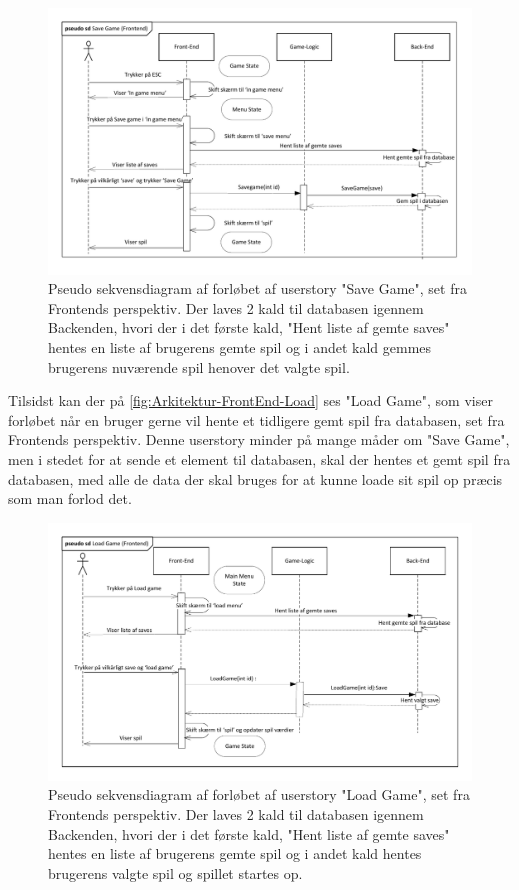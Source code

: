 \begin{figure}[H]
\centering
\includegraphics[width = \textwidth]{02-Body/Images/Front-End_-_Arkitektur-savegame.pdf}
\caption{Pseudo sekvensdiagram af forløbet af userstory "Save Game", set fra Frontends perspektiv. Der laves 2 kald til databasen igennem Backenden, hvori der i det første kald,  "Hent liste af gemte saves" hentes en liste af brugerens gemte spil og i andet kald gemmes brugerens nuværende spil henover det valgte spil.}
\label{fig:Arkitektur-FrontEnd-Save}
\end{figure}

\noindent Tilsidst kan der på \autoref{fig:Arkitektur-FrontEnd-Load} ses "Load Game", som viser forløbet når en bruger gerne vil hente et tidligere gemt spil fra databasen, set fra Frontends perspektiv. Denne userstory minder på mange måder om "Save Game", men i stedet for at sende et element til databasen, skal der hentes et gemt spil fra databasen, med alle de data der skal bruges for at kunne loade sit spil op præcis som man forlod det. \\

\begin{figure}[H]
\centering
\includegraphics[width = \textwidth]{02-Body/Images/Front-End_-_Arkitektur-loadgame.pdf}
\caption{Pseudo sekvensdiagram af forløbet af userstory "Load Game", set fra Frontends perspektiv. Der laves 2 kald til databasen igennem Backenden, hvori der i det første kald,  "Hent liste af gemte saves" hentes en liste af brugerens gemte spil og i andet kald hentes  brugerens valgte spil og spillet startes op.}
\label{fig:Arkitektur-FrontEnd-Load}
\end{figure}

\newpage
